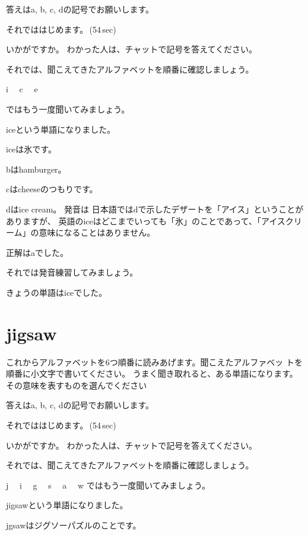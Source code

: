 \documentclass[12pt]{jlreq}
\let\textipa\undefined
\newcommand{\myMouse}{%
  {\large \ComputerMouse}
}
\begin{document}
答えはa, b, c, dの記号でお願いします。

それでははじめます。\faVolumeUp\,(54\,sec)

いかがですか。
わかった人は、チャットで記号を答えてください。

それでは、聞こえてきたアルファベットを順番に確認しましょう。{\large \ComputerMouse}

i\,\,
{\large \ComputerMouse}\,\,
c\,\,
{\large \ComputerMouse}\,\,
e\,\,

ではもう一度聞いてみましょう。


iceという単語になりました。

iceは氷です。



bはhamburger。

cはcheeseのつもりです。

dはice cream。
発音は\textipa{/aIs kri:m/}
日本語ではdで示したデザートを「アイス」ということがありますが、
英語のiceはどこまでいっても「氷」のことであって、「アイスクリーム」の意味になることはありません。


正解はaでした。\textipa{/aIs/}

それでは発音練習してみましょう。

きょうの単語はiceでした。
\newpage
\section{jigsaw}

これからアルファベットを6つ順番に読みあげます。聞こえたアルファベッ
トを順番に小文字で書いてください。
うまく聞き取れると、ある単語になります。
その意味を表すものを選んでください

答えはa, b, c, dの記号でお願いします。

それでははじめます。\faVolumeUp\,(54\,sec)

いかがですか。
わかった人は、チャットで記号を答えてください。

それでは、聞こえてきたアルファベットを順番に確認しましょう。{\large \ComputerMouse}

j\,\,
{\large \ComputerMouse}\,\,
i\,\,
{\large \ComputerMouse}\,\,
g\,\,
{\large \ComputerMouse}\,\,
s\,\,
{\large \ComputerMouse}\,\,
a\,\,
\myMouse\,\,
w
ではもう一度聞いてみましょう。


jigsawという単語になりました。

jgsawはジグソーパズルのことです。
\end{document}
